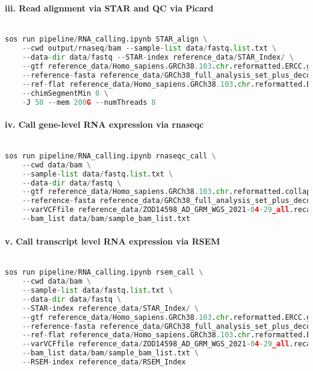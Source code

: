 \documentclass[12pt]{article}
\begin{document}
\paragraph*{iii. Read alignment via STAR and QC via Picard}


\noindent
\begin{lstlisting}[language=Python]

sos run pipeline/RNA_calling.ipynb STAR_align \
    --cwd output/rnaseq/bam --sample-list data/fastq.list.txt \
    --data-dir data/fastq --STAR-index reference_data/STAR_Index/ \
    --gtf reference_data/Homo_sapiens.GRCh38.103.chr.reformatted.ERCC.gtf \
    --reference-fasta reference_data/GRCh38_full_analysis_set_plus_decoy_hla.noALT_noHLA_noDecoy_ERCC.fasta \
    --ref-flat reference_data/Homo_sapiens.GRCh38.103.chr.reformatted.ERCC.ref.flat \
    --chimSegmentMin 0 \
    -J 50 --mem 200G --numThreads 8

\end{lstlisting}




\paragraph*{iv. Call gene-level RNA expression via rnaseqc}


\noindent
\begin{lstlisting}[language=Python]

sos run pipeline/RNA_calling.ipynb rnaseqc_call \
    --cwd data/bam \
    --sample-list data/fastq.list.txt \
    --data-dir data/fastq \
    --gtf reference_data/Homo_sapiens.GRCh38.103.chr.reformatted.collapse_only.gene.gtf \
    --reference-fasta reference_data/GRCh38_full_analysis_set_plus_decoy_hla.noALT_noHLA_noDecoy_ERCC.fasta \
    --varVCFfile reference_data/ZOD14598_AD_GRM_WGS_2021-04-29_all.recalibrated_variants.leftnorm.filtered.AF.WASP.vcf \
    --bam_list data/bam/sample_bam_list.txt

\end{lstlisting}




\paragraph*{v. Call transcript level RNA expression via RSEM}


\noindent
\begin{lstlisting}[language=Python]

sos run pipeline/RNA_calling.ipynb rsem_call \
    --cwd data/bam \
    --sample-list data/fastq.list.txt \
    --data-dir data/fastq \
    --STAR-index reference_data/STAR_Index/ \
    --gtf reference_data/Homo_sapiens.GRCh38.103.chr.reformatted.ERCC.gtf \
    --reference-fasta reference_data/GRCh38_full_analysis_set_plus_decoy_hla.noALT_noHLA_noDecoy_ERCC.fasta \
    --ref-flat reference_data/Homo_sapiens.GRCh38.103.chr.reformatted.ERCC.ref.flat \
    --varVCFfile reference_data/ZOD14598_AD_GRM_WGS_2021-04-29_all.recalibrated_variants.leftnorm.filtered.AF.WASP.vcf \
    --bam_list data/bam/sample_bam_list.txt \
    --RSEM-index reference_data/RSEM_Index

\end{lstlisting}
\end{document}
